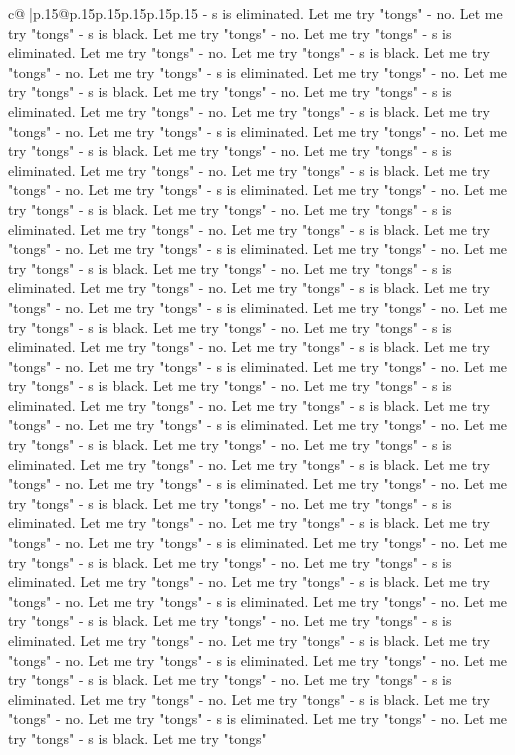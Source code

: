 \documentclass{article}
\begin{document}
{\begin{supertabular}{c@{$\;$}|p{.15\linewidth}@{}p{.15\linewidth}p{.15\linewidth}p{.15\linewidth}p{.15\linewidth}p{.15\linewidth}}
{{{{-} s is eliminated. Let me try "tongs" {-} no. Let me try "tongs" {-} s is black. Let me try "tongs" {-} no. Let me try "tongs" {-} s is eliminated. Let me try "tongs" {-} no. Let me try "tongs" {-} s is black. Let me try "tongs" {-} no. Let me try "tongs" {-} s is eliminated. Let me try "tongs" {-} no. Let me try "tongs" {-} s is black. Let me try "tongs" {-} no. Let me try "tongs" {-} s is eliminated. Let me try "tongs" {-} no. Let me try "tongs" {-} s is black. Let me try "tongs" {-} no. Let me try "tongs" {-} s is eliminated. Let me try "tongs" {-} no. Let me try "tongs" {-} s is black. Let me try "tongs" {-} no. Let me try "tongs" {-} s is eliminated. Let me try "tongs" {-} no. Let me try "tongs" {-} s is black. Let me try "tongs" {-} no. Let me try "tongs" {-} s is eliminated. Let me try "tongs" {-} no. Let me try "tongs" {-} s is black. Let me try "tongs" {-} no. Let me try "tongs" {-} s is eliminated. Let me try "tongs" {-} no. Let me try "tongs" {-} s is black. Let me try "tongs" {-} no. Let me try "tongs" {-} s is eliminated. Let me try "tongs" {-} no. Let me try "tongs" {-} s is black. Let me try "tongs" {-} no. Let me try "tongs" {-} s is eliminated. Let me try "tongs" {-} no. Let me try "tongs" {-} s is black. Let me try "tongs" {-} no. Let me try "tongs" {-} s is eliminated. Let me try "tongs" {-} no. Let me try "tongs" {-} s is black. Let me try "tongs" {-} no. Let me try "tongs" {-} s is eliminated. Let me try "tongs" {-} no. Let me try "tongs" {-} s is black. Let me try "tongs" {-} no. Let me try "tongs" {-} s is eliminated. Let me try "tongs" {-} no. Let me try "tongs" {-} s is black. Let me try "tongs" {-} no. Let me try "tongs" {-} s is eliminated. Let me try "tongs" {-} no. Let me try "tongs" {-} s is black. Let me try "tongs" {-} no. Let me try "tongs" {-} s is eliminated. Let me try "tongs" {-} no. Let me try "tongs" {-} s is black. Let me try "tongs" {-} no. Let me try "tongs" {-} s is eliminated. Let me try "tongs" {-} no. Let me try "tongs" {-} s is black. Let me try "tongs" {-} no. Let me try "tongs" {-} s is eliminated. Let me try "tongs" {-} no. Let me try "tongs" {-} s is black. Let me try "tongs" {-} no. Let me try "tongs" {-} s is eliminated. Let me try "tongs" {-} no. Let me try "tongs" {-} s is black. Let me try "tongs" {-} no. Let me try "tongs" {-} s is eliminated. Let me try "tongs" {-} no. Let me try "tongs" {-} s is black. Let me try "tongs" {-} no. Let me try "tongs" {-} s is eliminated. Let me try "tongs" {-} no. Let me try "tongs" {-} s is black. Let me try "tongs" {-} no. Let me try "tongs" {-} s is eliminated. Let me try "tongs" {-} no. Let me try "tongs" {-} s is black. Let me try "tongs" {-} no. Let me try "tongs" {-} s is eliminated. Let me try "tongs" {-} no. Let me try "tongs" {-} s is black. Let me try "tongs" {-} no. Let me try "tongs" {-} s is eliminated. Let me try "tongs" {-} no. Let me try "tongs" {-} s is black. Let me try "tongs" {-} no. Let me try "tongs" {-} s is eliminated. Let me try "tongs" {-} no. Let me try "tongs" {-} s is black. Let me try "tongs" {-} no. Let me try "tongs" {-} s is eliminated. Let me try "tongs" {-} no. Let me try "tongs" {-} s is black. Let me try "tongs" }}}
\end{supertabular}}
\end{document}
